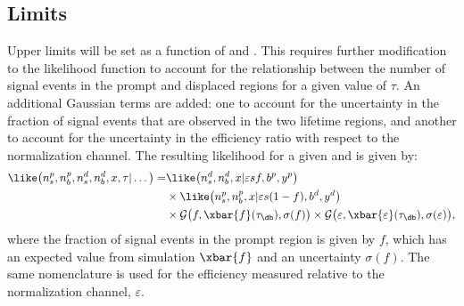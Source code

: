 \subsection{Limits}
Upper limits will be set as a function of \mass{\db} and \lifetime{\db}.
This requires further modification to the likelihood function to account for the relationship
between the number of signal events in the prompt and displaced regions for a given value of
$\tau$.
An additional Gaussian terms are added: one to account for the uncertainty in the fraction of signal
events that are observed in the two lifetime regions, and another to account for the uncertainty in
the efficiency ratio with respect to the normalization channel.
The resulting likelihood for a given \mass{\db} and \lifetime{\db} is given by:
\begin{align}
  \like\big(n_s^p, n_b^p, n_s^d, n_b^d, x, \tau | \dots\big) =
   &\like\big(n_s^d, n_b^d, x | \varepsilon s f,b^p,y^p\big) \\\nonumber
   &\times\like\big(n_s^p, n_b^p, x | \varepsilon s(1-f),b^d,y^d\big)\\\nonumber
   &\times\mathcal{G}\big(f, \xbar{f}(\tau_\db),\sigma(f)\big)
   \times\mathcal{G}\big(\varepsilon, \xbar{\varepsilon}(\tau_\db),\sigma(\varepsilon)\big),
\end{align}
where the fraction of signal events in the prompt region is given by $f$,
which has an expected value from simulation $\xbar{f}$ and an uncertainty $\sigma(f)$.
The same nomenclature is used for the efficiency measured relative to the normalization channel,
$\varepsilon$.










